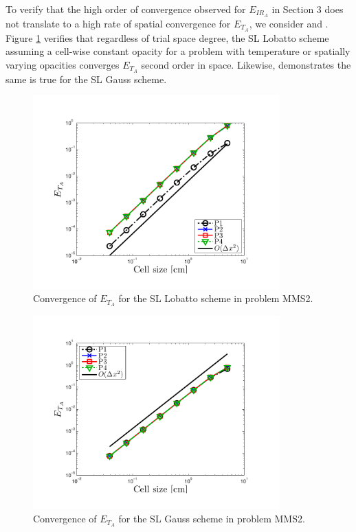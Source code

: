 To verify that the high order of convergence observed for $E_{IR_A}$ in Section 3 does not translate to a high rate of spatial convergence for $E_{T_A}$, we consider  and .
Figure \ref{fig:mms3_constant_lobatto_temp_A} verifies that regardless of trial space degree, the SL Lobatto scheme assuming a cell-wise constant opacity for a problem with temperature or spatially varying opacities converges $E_{T_A}$ second order in space.
Likewise,  demonstrates the same is true for the SL Gauss scheme.
\begin{figure}[!hbp]
\centering
\includegraphics[width=9.5cm,trim=0.25in  0.2in 0.75in 0.5in,clip=true]{chapter6_grey_radtran/Dissertation_Data/MMS3_Constant_XS_SL_Lobatto_temp_A.pdf}
\caption{Convergence of $E_{T_A}$ for the SL Lobatto scheme in problem MMS2.}
\label{fig:mms3_constant_lobatto_temp_A}
\end{figure}
%
%
\begin{figure}[!htp]
\centering
\includegraphics[width=9.5cm,trim=0.25in  0.2in 0.75in 0.5in,clip=true]{chapter6_grey_radtran/Dissertation_Data/MMS3_Constant_XS_SL_Gauss_temp_A.pdf}
\caption{Convergence of $E_{T_A}$ for the SL Gauss scheme in problem MMS2.}
\label{fig:mms3_constant_gauss_temp_A}
\end{figure}

